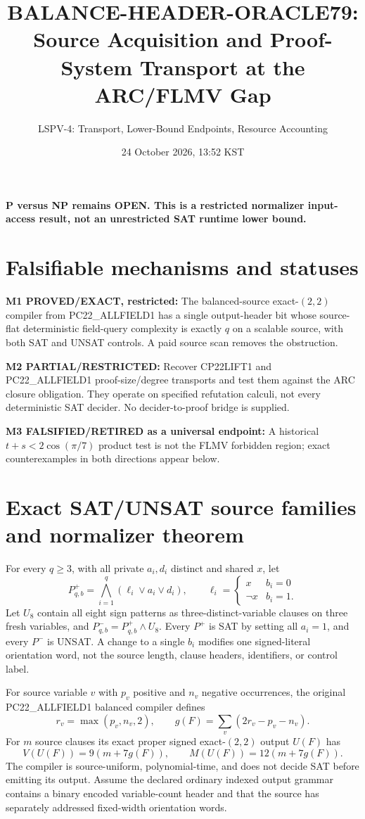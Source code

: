 \documentclass[11pt]{article}
\title{BALANCE-HEADER-ORACLE79: Source Acquisition and Proof-System Transport at the ARC/FLMV Gap}
\author{LSPV-4: Transport, Lower-Bound Endpoints, Resource Accounting}
\date{24 October 2026, 13:52 KST}
\begin{document}
\maketitle
\begin{center}\textbf{P versus NP remains OPEN. This is a restricted normalizer input-access result, not an unrestricted SAT runtime lower bound.}\end{center}
\section{Falsifiable mechanisms and statuses}
\noindent\textbf{M1 PROVED/EXACT, restricted:} The balanced-source exact-$(2,2)$ compiler from PC22\_ALLFIELD1 has a single output-header bit whose source-flat deterministic field-query complexity is exactly $q$ on a scalable source, with both SAT and UNSAT controls. A paid source scan removes the obstruction.\par
\noindent\textbf{M2 PARTIAL/RESTRICTED:} Recover CP22LIFT1 and PC22\_ALLFIELD1 proof-size/degree transports and test them against the ARC closure obligation. They operate on specified refutation calculi, not every deterministic SAT decider. No decider-to-proof bridge is supplied.\par
\noindent\textbf{M3 FALSIFIED/RETIRED as a universal endpoint:} A historical $t+s<2\cos(\pi/7)$ product test is not the FLMV forbidden region; exact counterexamples in both directions appear below.
\section{Exact SAT/UNSAT source families and normalizer theorem}
For every $q\ge3$, with all private $a_i,d_i$ distinct and shared $x$, let
\[
P_{q,b}^{+}=\bigwedge_{i=1}^{q}(\ell_i\lor a_i\lor d_i),\qquad
\ell_i=\begin{cases}x&b_i=0\\\neg x&b_i=1.\end{cases}
\]
Let $U_8$ contain all eight sign patterns as three-distinct-variable clauses on three fresh variables, and $P_{q,b}^{-}=P_{q,b}^{+}\wedge U_8$. Every $P^+$ is SAT by setting all $a_i=1$, and every $P^-$ is UNSAT. A change to a single $b_i$ modifies one signed-literal orientation word, not the source length, clause headers, identifiers, or control label.

For source variable $v$ with $p_v$ positive and $n_v$ negative occurrences, the original PC22\_ALLFIELD1 balanced compiler defines
\[
r_v=\max(p_v,n_v,2),\qquad
g(F)=\sum_{v}(2r_v-p_v-n_v).
\]
For $m$ source clauses its exact proper signed exact-$(2,2)$ output $U(F)$ has
\[
V(U(F))=9(m+7g(F)),\qquad M(U(F))=12(m+7g(F)).
\]
The compiler is source-uniform, polynomial-time, and does not decide SAT before emitting its output. Assume the declared ordinary indexed output grammar contains a binary encoded variable-count header and that the source has separately addressed fixed-width orientation words.
\end{document}

